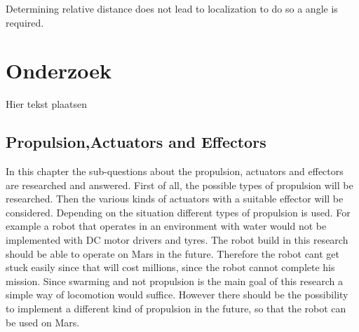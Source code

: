 \documentclass[10pt,a4paper]{article}
\begin{document}
Determining relative distance does not lead to localization to do so a angle is required. 
\newpage

\section{Onderzoek}
Hier tekst plaatsen

\subsection{Propulsion,Actuators and Effectors}

In this chapter the sub-questions about the propulsion, actuators and effectors are researched and answered. First of all, the possible types of propulsion will be researched. Then the various kinds of actuators with a suitable effector will be considered. Depending on the situation different types of propulsion is used. For example a robot that operates in an environment with water would not be implemented with DC motor drivers and tyres. The robot build in this research should be able to operate on Mars in the future. Therefore the robot cant get stuck easily since that will cost millions, since the robot cannot complete his mission. Since swarming and not propulsion is the main goal of this research a simple way of locomotion would suffice. However there should be the possibility to implement a different kind of propulsion in the future, so that the robot can be used on Mars. 


\end{document}
